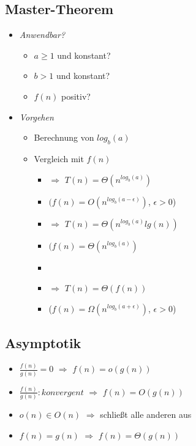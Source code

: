     \subsection{Master-Theorem}
        \begin{itemize}
            \item \textit{Anwendbar?}
                \begin{itemize}
                    \item $a \geq 1$ und konstant?
                    \item $b > 1$ und konstant?
                    \item $f(n)$ positiv?
                \end{itemize}
            \item \textit{Vorgehen}
                \begin{itemize}
                    \item Berechnung von $log_b(a)$
                    \item Vergleich mit $f(n)$
                        \begin{itemize}
                            \item {}  $\Rightarrow$ $T(n) = \Theta(n^{log_b(a)})$
                            \item[] $(f(n) = O(n^{log_b(a-\epsilon)})$, $\epsilon > 0$)
                            \item {}  $\Rightarrow$ $T(n) = \Theta(n^{log_b(a)} lg(n))$
                            \item[] $(f(n) = \Theta(n^{log_b(a)})$
                            \item {} 
                            \item[] {}  $\Rightarrow$ $T(n) = \Theta(f(n))$
                            \item[] ($f(n) = \Omega (n^{log_b(a + \epsilon)})$, $\epsilon > 0$) 
                        \end{itemize}
                \end{itemize}
        \end{itemize}

    \subsection{Asymptotik}
        \begin{itemize}
            \item $\frac{f(n)}{g(n)} = 0$ $\Rightarrow$ $f(n) = o(g(n))$
            \item $\frac{f(n)}{g(n)}: konvergent$ $\Rightarrow$ $f(n) = O(g(n))$
            \item $o(n) \in O(n)$ $\Rightarrow$ schließt alle anderen aus
            \item $f(n) = g(n)$ $\Rightarrow$ $f(n) = \Theta(g(n))$
        \end{itemize}

